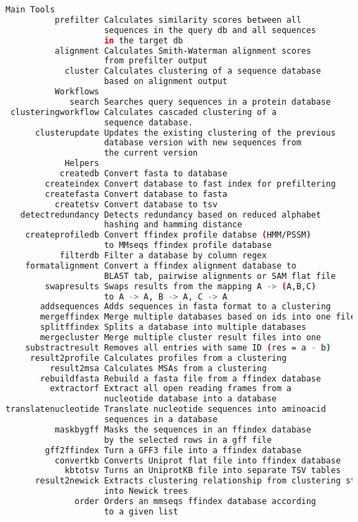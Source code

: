 \documentclass[11pt,a4paper]{report}
\begin{document}
\begin{lstlisting}[language=bash]
         Main Tools
          prefilter Calculates similarity scores between all 
                    sequences in the query db and all sequences 
                    in the target db
          alignment Calculates Smith-Waterman alignment scores 
                    from prefilter output
            cluster Calculates clustering of a sequence database 
                    based on alignment output
          Workflows
             search Searches query sequences in a protein database
 clusteringworkflow Calculates cascaded clustering of a 
                    sequence database.
      clusterupdate Updates the existing clustering of the previous 
                    database version with new sequences from 
                    the current version
            Helpers
           createdb Convert fasta to database 
        createindex Convert database to fast index for prefiltering
        createfasta Convert database to fasta
          createtsv Convert database to tsv
   detectredundancy Detects redundancy based on reduced alphabet 
                    hashing and hamming distance
    createprofiledb Convert ffindex profile databse (HMM/PSSM) 
                    to MMseqs ffindex profile database
           filterdb Filter a database by column regex
    formatalignment Convert a ffindex alignment database to
                    BLAST tab, pairwise alignments or SAM flat file
        swapresults Swaps results from the mapping A -> (A,B,C) 
                    to A -> A, B -> A, C -> A
       addsequences Adds sequences in fasta format to a clustering
       mergeffindex Merge multiple databases based on ids into one file
       splitffindex Splits a database into multiple databases
       mergecluster Merge multiple cluster result files into one
    substractresult Removes all entries with same ID (res = a - b)
     result2profile Calculates profiles from a clustering
         result2msa Calculates MSAs from a clustering
       rebuildfasta Rebuild a fasta file from a ffindex database
         extractorf Extract all open reading frames from a 
                    nucleotide database into a database
translatenucleotide Translate nucleotide sequences into aminoacid 
                    sequences in a database
          maskbygff Masks the sequences in an ffindex database 
                    by the selected rows in a gff file
        gff2ffindex Turn a GFF3 file into a ffindex database
          convertkb Converts Uniprot flat file into ffindex database
            kbtotsv Turns an UniprotKB file into separate TSV tables
      result2newick Extracts clustering relationship from clustering steps 
                    into Newick trees
              order Orders an mmseqs ffindex database according 
                    to a given list
\end{lstlisting}
\end{document}
